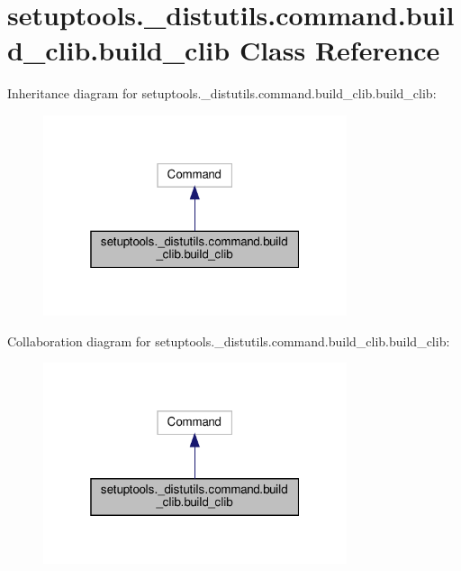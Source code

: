 \hypertarget{classsetuptools_1_1__distutils_1_1command_1_1build__clib_1_1build__clib}{}\section{setuptools.\+\_\+distutils.\+command.\+build\+\_\+clib.\+build\+\_\+clib Class Reference}
\label{classsetuptools_1_1__distutils_1_1command_1_1build__clib_1_1build__clib}


Inheritance diagram for setuptools.\+\_\+distutils.\+command.\+build\+\_\+clib.\+build\+\_\+clib\+:
\nopagebreak
\begin{figure}[H]
\begin{center}
\leavevmode
\includegraphics[width=253pt]{classsetuptools_1_1__distutils_1_1command_1_1build__clib_1_1build__clib__inherit__graph}
\end{center}
\end{figure}


Collaboration diagram for setuptools.\+\_\+distutils.\+command.\+build\+\_\+clib.\+build\+\_\+clib\+:
\nopagebreak
\begin{figure}[H]
\begin{center}
\leavevmode
\includegraphics[width=253pt]{classsetuptools_1_1__distutils_1_1command_1_1build__clib_1_1build__clib__coll__graph}
\end{center}
\end{figure}

